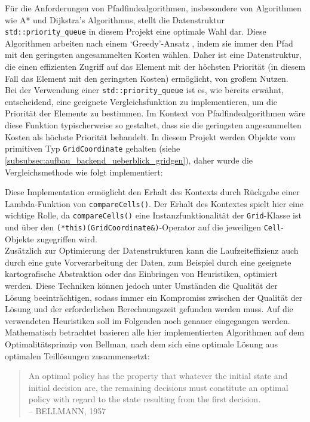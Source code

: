 Für die Anforderungen von Pfadfindealgorithmen, insbesondere von Algorithmen wie A* und Dijkstra's Algorithmus,
stellt die Datenstruktur \texttt{std::priority\_queue} in diesem Projekt eine optimale Wahl dar.
Diese Algorithmen arbeiten nach einem `Greedy'-Ansatz \cite{korte2006}, indem sie immer den Pfad mit den geringsten angesammelten Kosten wählen.
Daher ist eine Datenstruktur, die einen effizienten Zugriff auf das Element mit der höchsten Priorität (in diesem Fall
das Element mit den geringsten Kosten) ermöglicht, von großem Nutzen.\\
Bei der Verwendung einer \texttt{std::priority\_queue} ist es, wie bereits erwähnt, entscheidend, eine geeignete Vergleichsfunktion
zu implementieren, um die Priorität der Elemente zu bestimmen.
Im Kontext von Pfadfindealgorithmen wäre diese Funktion typischerweise so gestaltet, dass sie die geringsten angesammelten
Kosten als höchste Priorität behandelt.
In diesem Projekt werden Objekte vom primitiven Typ \texttt{GridCoordinate} gehalten (siehe \ref{subsubsec:aufbau_backend_ueberblick_gridgen}),
daher wurde die Vergleichsmethode wie folgt implementiert:

Diese Implementation ermöglicht den Erhalt des Kontexts durch Rückgabe einer Lambda-Funktion von \texttt{compareCells()}.
Der Erhalt des Kontextes spielt hier eine wichtige Rolle, da \texttt{compareCells()} eine Instanzfunktionalität der
\texttt{Grid}-Klasse ist und über den \texttt{(*this)(GridCoordinate\&)}-Operator auf die jeweiligen \texttt{Cell}-Objekte
zugegriffen wird.\\
Zusätzlich zur Optimierung der Datenstrukturen kann die Laufzeiteffizienz auch durch eine gute Vorverarbeitung der Daten,
zum Beispiel durch eine geeignete kartografische Abstraktion oder das Einbringen von Heuristiken, optimiert werden.
Diese Techniken können jedoch unter Umständen die Qualität der Lösung beeinträchtigen, sodass immer ein Kompromiss zwischen
der Qualität der Lösung und der erforderlichen Berechnungszeit gefunden werden muss.
Auf die verwendeten Heuristiken soll im Folgenden noch genauer eingegangen werden.\\
Mathematisch betrachtet basieren alle hier implementierten Algorithmen \cite{morin1982} auf dem Optimalitätsprinzip von Bellman, nach
dem sich eine optimale Lösung aus optimalen Teillösungen zusammensetzt:
\begin{quotation}
An optimal policy has the property that whatever the initial state and initial decision are, the remaining decisions
must constitute an optimal policy with regard to the state resulting from the first decision.\\
-- BELLMANN, 1957 \cite{bellman2010}
\end{quotation}

